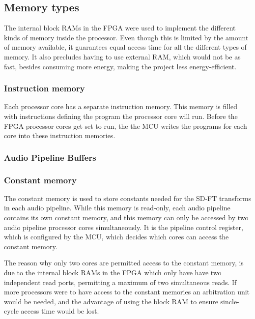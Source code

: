 \subsection{Memory types}\label{subsec:fpga-memory}

The internal block RAMs in the FPGA were used to implement the different kinds
of memory inside the processor. Even though this is limited by the amount of
memory available, it guarantees equal access time for all the different types
of memory. It also precludes having to use external RAM, which would not be as
fast, besides consuming more energy, making the project less energy-efficient.

\subsubsection{Instruction memory}

Each processor core has a separate instruction memory. This memory is filled
with instructions defining the program the processor core will run. Before the
FPGA processor cores get set to run, the the MCU writes the programs for each
core into these instruction memories.

\subsubsection{Audio Pipeline Buffers}

\subsubsection{Constant memory}

The constant memory is used to store constants needed for the SD-FT transforms
in each audio pipeline. While this memory is read-only, each audio pipeline
contains its own constant memory, and this memory can only be accessed by two
audio pipeline processor cores simultaneously. It is the pipeline control
register, which is configured by the MCU, which decides which cores can access
the constant memory.

The reason why only two cores are permitted access to the constant memory, is
due to the internal block RAMs in the FPGA which only have have two independent
read ports, permitting a maximum of two simultaneous reads. If more processors
were to have access to the constant memories an arbitration unit would be
needed, and the advantage of using the block RAM to ensure sincle-cycle access
time would be lost.
